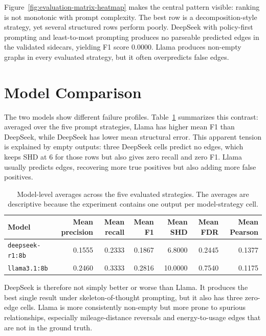 Figure~\ref{fig:evaluation-matrix-heatmap} makes the central pattern visible:
ranking is not monotonic with prompt complexity. The best row is a
decomposition-style strategy, yet several structured rows perform poorly.
DeepSeek with policy-first prompting and least-to-most prompting produces no
parseable predicted edges in the validated sidecars, yielding F1 score 0.0000.
Llama produces non-empty graphs in every evaluated strategy, but it often
overpredicts false edges.

\section{Model Comparison}

The two models show different failure profiles. Table~\ref{tab:model-average-results}
summarizes this contrast: averaged over the five prompt strategies, Llama has
higher mean F1 than DeepSeek, while DeepSeek has lower mean structural error.
This apparent tension is explained by empty outputs: three DeepSeek cells
predict no edges, which keeps SHD at 6 for those rows but also gives zero
recall and zero F1. Llama usually predicts edges, recovering more true
positives but also adding more false positives.

\begin{table}[!htbp]
  \centering
  \scriptsize
  \setlength{\tabcolsep}{3pt}
  \begin{tabular}{@{}lrrrrrr@{}}
    \toprule
    Model & Mean precision & Mean recall & Mean F1 & Mean SHD & Mean FDR & Mean Pearson \\
    \midrule
    \texttt{deepseek-r1:8b} & 0.1555 & 0.2333 & 0.1867 & 6.8000 & 0.2445 & 0.1377 \\
    \texttt{llama3.1:8b} & 0.2460 & 0.3333 & 0.2816 & 10.0000 & 0.7540 & 0.1175 \\
    \bottomrule
  \end{tabular}
  \caption{Model-level averages across the five evaluated strategies. The averages are descriptive because the experiment contains one output per model-strategy cell.}
  \label{tab:model-average-results}
\end{table}

DeepSeek is therefore not simply better or worse than Llama. It produces the
best single result under skeleton-of-thought prompting, but it also has three
zero-edge cells. Llama is more consistently non-empty but more prone to
spurious relationships, especially mileage-distance reversals and
energy-to-usage edges that are not in the ground truth.

